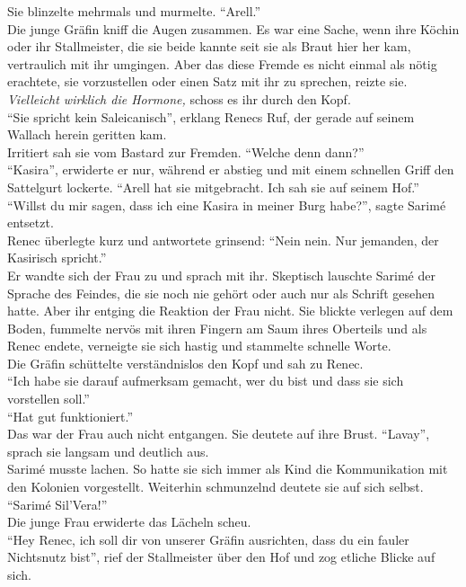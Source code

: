 Sie blinzelte mehrmals und murmelte. ``Arell.''\\
Die junge Gräfin kniff die Augen zusammen. Es war eine Sache, wenn ihre Köchin oder ihr 
Stallmeister, die sie beide kannte seit sie als Braut hier her kam, vertraulich mit ihr umgingen. 
Aber das diese Fremde es nicht einmal als nötig erachtete, sie vorzustellen oder einen Satz mit ihr 
zu sprechen, reizte sie. \textit{Vielleicht wirklich die Hormone,} schoss es ihr durch den Kopf.\\
``Sie spricht kein Saleicanisch'', erklang Renecs Ruf, der gerade auf seinem Wallach herein 
geritten kam.\\
Irritiert sah sie vom Bastard zur Fremden. ``Welche denn dann?''\\
``Kasira'', erwiderte er nur, während er abstieg und mit einem schnellen Griff den Sattelgurt 
lockerte. ``Arell hat sie mitgebracht. Ich sah sie auf seinem Hof.''\\
``Willst du mir sagen, dass ich eine Kasira in meiner Burg habe?'', sagte Sarimé entsetzt.\\
Renec überlegte kurz und antwortete grinsend: ``Nein nein. Nur jemanden, der Kasirisch spricht.''\\
Er wandte sich der Frau zu und sprach mit ihr. Skeptisch lauschte Sarimé der Sprache des Feindes, 
die sie noch nie gehört oder auch nur als Schrift gesehen hatte. Aber ihr entging die Reaktion der 
Frau nicht. Sie blickte verlegen auf dem Boden, fummelte nervös mit ihren Fingern am Saum ihres 
Oberteils und als Renec endete, verneigte sie sich hastig und stammelte schnelle Worte.\\
Die Gräfin schüttelte verständnislos den Kopf und sah zu Renec.\\
``Ich habe sie darauf aufmerksam gemacht, wer du bist und dass sie sich vorstellen soll.''\\
``Hat gut funktioniert.''\\
Das war der Frau auch nicht entgangen. Sie deutete auf ihre Brust. ``Lavay'', sprach sie langsam 
und deutlich aus.\\
Sarimé musste lachen. So hatte sie sich immer als Kind die Kommunikation mit den Kolonien 
vorgestellt. Weiterhin schmunzelnd deutete sie auf sich selbst. ``Sarimé Sil'Vera!''\\
Die junge Frau erwiderte das Lächeln scheu.\\
``Hey Renec, ich soll dir von unserer Gräfin ausrichten, dass du ein fauler Nichtsnutz bist'', rief 
der Stallmeister über den Hof und zog etliche Blicke auf sich.\\
